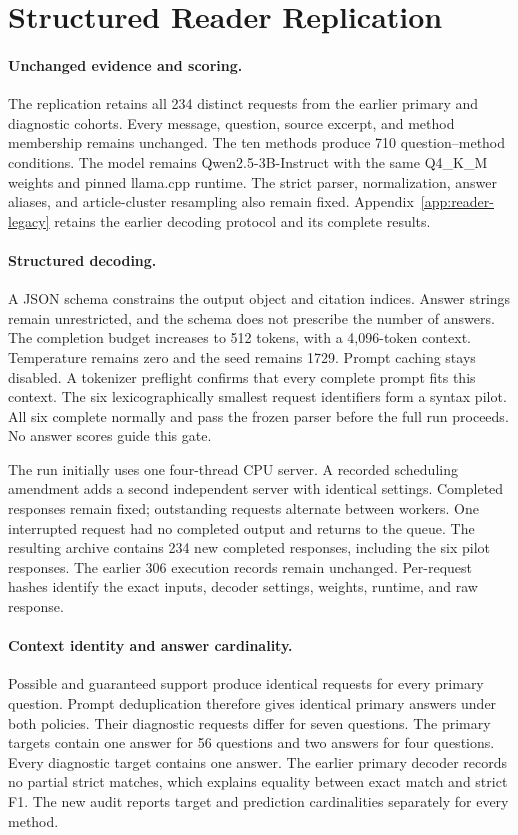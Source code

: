 \section{Structured Reader Replication}
\label{app:reader}


\paragraph{Unchanged evidence and scoring.}
The replication retains all 234 distinct requests from the earlier primary and diagnostic cohorts.
Every message, question, source excerpt, and method membership remains unchanged.
The ten methods produce 710 question--method conditions.
The model remains Qwen2.5-3B-Instruct with the same Q4\_K\_M weights and pinned llama.cpp runtime.
The strict parser, normalization, answer aliases, and article-cluster resampling also remain fixed.
Appendix~\ref{app:reader-legacy} retains the earlier decoding protocol and its complete results.

\paragraph{Structured decoding.}
A JSON schema constrains the output object and citation indices.
Answer strings remain unrestricted, and the schema does not prescribe the number of answers.
The completion budget increases to 512 tokens, with a 4,096-token context.
Temperature remains zero and the seed remains 1729.
Prompt caching stays disabled.
A tokenizer preflight confirms that every complete prompt fits this context.
The six lexicographically smallest request identifiers form a syntax pilot.
All six complete normally and pass the frozen parser before the full run proceeds.
No answer scores guide this gate.

The run initially uses one four-thread CPU server.
A recorded scheduling amendment adds a second independent server with identical settings.
Completed responses remain fixed; outstanding requests alternate between workers.
One interrupted request had no completed output and returns to the queue.
The resulting archive contains 234 new completed responses, including the six pilot responses.
The earlier 306 execution records remain unchanged.
Per-request hashes identify the exact inputs, decoder settings, weights, runtime, and raw response.

\paragraph{Context identity and answer cardinality.}
Possible and guaranteed support produce identical requests for every primary question.
Prompt deduplication therefore gives identical primary answers under both policies.
Their diagnostic requests differ for seven questions.
The primary targets contain one answer for 56 questions and two answers for four questions.
Every diagnostic target contains one answer.
The earlier primary decoder records no partial strict matches, which explains equality between exact match and strict F1.
The new audit reports target and prediction cardinalities separately for every method.

